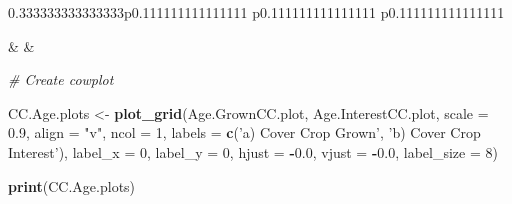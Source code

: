 \documentclass[12pt,]{article}
\newenvironment{Shaded}{\begin{snugshade}}{\end{snugshade}}
\newcommand{\KeywordTok}[1]{\textcolor[rgb]{0.13,0.29,0.53}{\textbf{#1}}}
\newcommand{\DataTypeTok}[1]{\textcolor[rgb]{0.13,0.29,0.53}{#1}}
\newcommand{\DecValTok}[1]{\textcolor[rgb]{0.00,0.00,0.81}{#1}}
\newcommand{\FloatTok}[1]{\textcolor[rgb]{0.00,0.00,0.81}{#1}}
\newcommand{\StringTok}[1]{\textcolor[rgb]{0.31,0.60,0.02}{#1}}
\newcommand{\CommentTok}[1]{\textcolor[rgb]{0.56,0.35,0.01}{\textit{#1}}}
\newcommand{\OperatorTok}[1]{\textcolor[rgb]{0.81,0.36,0.00}{\textbf{#1}}}
\newcommand{\NormalTok}[1]{#1}
\begin{document}
\begin{table}[h]
\begin{raggedright}
\begin{threeparttable}
\begin{tabularx}{0.333333333333333\textwidth}{p{} p{} p{}}

 &
 &
 \tabularnewline[-0.5pt]


\end{tabularx}\end{threeparttable}
\par\end{raggedright}

\end{table}

\begin{Shaded}
\begin{Highlighting}[]
\CommentTok{# Create cowplot}

\NormalTok{CC.Age.plots <-}\StringTok{ }\KeywordTok{plot_grid}\NormalTok{(Age.GrownCC.plot, Age.InterestCC.plot, }\DataTypeTok{scale =} \FloatTok{0.9}\NormalTok{,}
                          \DataTypeTok{align =} \StringTok{"v"}\NormalTok{, }\DataTypeTok{ncol =} \DecValTok{1}\NormalTok{, }
                          \DataTypeTok{labels =} \KeywordTok{c}\NormalTok{(}\StringTok{'a) Cover Crop Grown'}\NormalTok{, }\StringTok{'b) Cover Crop Interest'}\NormalTok{), }
                          \DataTypeTok{label_x =} \DecValTok{0}\NormalTok{, }\DataTypeTok{label_y =} \DecValTok{0}\NormalTok{,}
  \DataTypeTok{hjust =} \OperatorTok{-}\FloatTok{0.0}\NormalTok{, }\DataTypeTok{vjust =} \OperatorTok{-}\FloatTok{0.0}\NormalTok{, }\DataTypeTok{label_size =} \DecValTok{8}\NormalTok{)}

\KeywordTok{print}\NormalTok{(CC.Age.plots) }
\end{Highlighting}
\end{Shaded}
\end{document}
